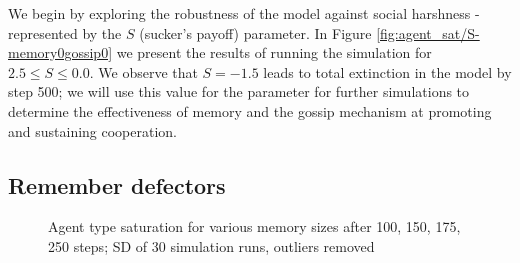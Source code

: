 \documentclass[english]{article}
\begin{document}
We begin by exploring the robustness of the model against social harshness - represented by the $S$ (sucker's payoff) parameter.
In Figure \ref{fig:agent_sat/S-memory0gossip0} we present the results of running the simulation for $2.5 \leq S \leq 0.0$.
We observe that $S = -1.5$ leads to total extinction in the model by step 500;
we will use this value for the parameter for further simulations to determine the effectiveness of memory and the gossip mechanism at promoting and sustaining cooperation.


\subsection{Remember defectors}
\begin{figure}[!ht]
  \centering
  \caption{Agent type saturation for various memory sizes after 100, 150, 175, 250 steps; SD of 30 simulation runs, outliers removed}
  \label{fig:agent_sat/memory_size}
\end{figure}
\end{document}
